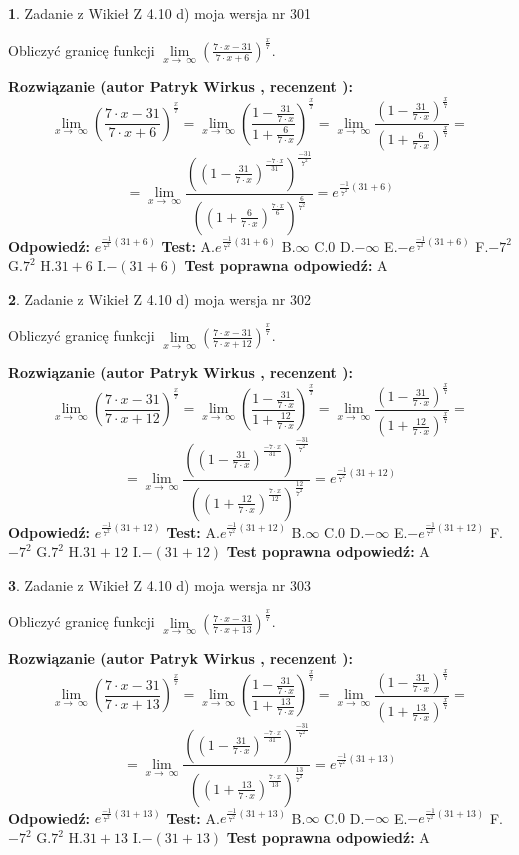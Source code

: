 \documentclass[12pt, a4paper]{article}
\theoremstyle{definition} %
\newtheorem{zad}{}
\newcommand{\zadStart}[1]{\begin{zad}#1\newline}
\newcommand{\zadStop}{\end{zad}}
\newcommand{\rozwStart}[2]{\noindent \textbf{Rozwiązanie (autor #1 , recenzent #2): }\newline}
\newcommand{\rozwStop}{\newline}
\newcommand{\odpStart}{\noindent \textbf{Odpowiedź:}\newline}
\newcommand{\odpStop}{\newline}
\newcommand{\testStart}{\noindent \textbf{Test:}\newline}
\newcommand{\testStop}{\newline}
\newcommand{\kluczStart}{\noindent \textbf{Test poprawna odpowiedź:}\newline}
\newcommand{\kluczStop}{\newline}
\begin{document}
\zadStart{Zadanie z Wikieł Z 4.10 d) moja wersja nr 301}


Obliczyć granicę funkcji  $\lim\limits_{x\to\ \infty}(\frac{7\cdot x-31}{7\cdot x+6})^{\frac{x}{7}}$.
\zadStop
\rozwStart{Patryk Wirkus}{}
$$\lim\limits_{x\to\ \infty}(\frac{7\cdot x-31}{7\cdot x+6})^{\frac{x}{7}} = \lim\limits_{x\to\ \infty}(\frac{1-\frac{31}{7\cdot x}}{1+\frac{6}{7\cdot x}})^{\frac{x}{7}}=\lim\limits_{x\to\ \infty}\frac{(1-\frac{31}{7\cdot x})^{\frac{x}{7}}}{(1+\frac{6}{7\cdot x})^{\frac{x}{7}}}=$$
$$=\lim\limits_{x\to\ \infty}\frac{((1-\frac{31}{7\cdot x})^{\frac{-7\cdot x}{31}})^{\frac{-31}{7^{2}}}}{((1+\frac{6}{7\cdot x})^{\frac{7\cdot x}{6}})^{\frac{6}{7^{2}}}}=e^{\frac{-1}{7^{2}}(31+6)}$$
\rozwStop
\odpStart
$e^{\frac{-1}{7^{2}}(31+6)}$
\odpStop
\testStart
A.$e^{\frac{-1}{7^{2}}(31+6)}$ B.$\infty$ C.$0$ D.$-\infty$ E.$-e^{\frac{-1}{7^{2}}(31+6)}$
F.$-7^{2}$ G.$7^{2}$
H.$31+6$
I.$-(31+6)$
\testStop
\kluczStart
A
\kluczStop



\zadStart{Zadanie z Wikieł Z 4.10 d) moja wersja nr 302}


Obliczyć granicę funkcji  $\lim\limits_{x\to\ \infty}(\frac{7\cdot x-31}{7\cdot x+12})^{\frac{x}{7}}$.
\zadStop
\rozwStart{Patryk Wirkus}{}
$$\lim\limits_{x\to\ \infty}(\frac{7\cdot x-31}{7\cdot x+12})^{\frac{x}{7}} = \lim\limits_{x\to\ \infty}(\frac{1-\frac{31}{7\cdot x}}{1+\frac{12}{7\cdot x}})^{\frac{x}{7}}=\lim\limits_{x\to\ \infty}\frac{(1-\frac{31}{7\cdot x})^{\frac{x}{7}}}{(1+\frac{12}{7\cdot x})^{\frac{x}{7}}}=$$
$$=\lim\limits_{x\to\ \infty}\frac{((1-\frac{31}{7\cdot x})^{\frac{-7\cdot x}{31}})^{\frac{-31}{7^{2}}}}{((1+\frac{12}{7\cdot x})^{\frac{7\cdot x}{12}})^{\frac{12}{7^{2}}}}=e^{\frac{-1}{7^{2}}(31+12)}$$
\rozwStop
\odpStart
$e^{\frac{-1}{7^{2}}(31+12)}$
\odpStop
\testStart
A.$e^{\frac{-1}{7^{2}}(31+12)}$ B.$\infty$ C.$0$ D.$-\infty$ E.$-e^{\frac{-1}{7^{2}}(31+12)}$
F.$-7^{2}$ G.$7^{2}$
H.$31+12$
I.$-(31+12)$
\testStop
\kluczStart
A
\kluczStop



\zadStart{Zadanie z Wikieł Z 4.10 d) moja wersja nr 303}


Obliczyć granicę funkcji  $\lim\limits_{x\to\ \infty}(\frac{7\cdot x-31}{7\cdot x+13})^{\frac{x}{7}}$.
\zadStop
\rozwStart{Patryk Wirkus}{}
$$\lim\limits_{x\to\ \infty}(\frac{7\cdot x-31}{7\cdot x+13})^{\frac{x}{7}} = \lim\limits_{x\to\ \infty}(\frac{1-\frac{31}{7\cdot x}}{1+\frac{13}{7\cdot x}})^{\frac{x}{7}}=\lim\limits_{x\to\ \infty}\frac{(1-\frac{31}{7\cdot x})^{\frac{x}{7}}}{(1+\frac{13}{7\cdot x})^{\frac{x}{7}}}=$$
$$=\lim\limits_{x\to\ \infty}\frac{((1-\frac{31}{7\cdot x})^{\frac{-7\cdot x}{31}})^{\frac{-31}{7^{2}}}}{((1+\frac{13}{7\cdot x})^{\frac{7\cdot x}{13}})^{\frac{13}{7^{2}}}}=e^{\frac{-1}{7^{2}}(31+13)}$$
\rozwStop
\odpStart
$e^{\frac{-1}{7^{2}}(31+13)}$
\odpStop
\testStart
A.$e^{\frac{-1}{7^{2}}(31+13)}$ B.$\infty$ C.$0$ D.$-\infty$ E.$-e^{\frac{-1}{7^{2}}(31+13)}$
F.$-7^{2}$ G.$7^{2}$
H.$31+13$
I.$-(31+13)$
\testStop
\kluczStart
A
\kluczStop
\end{document}
